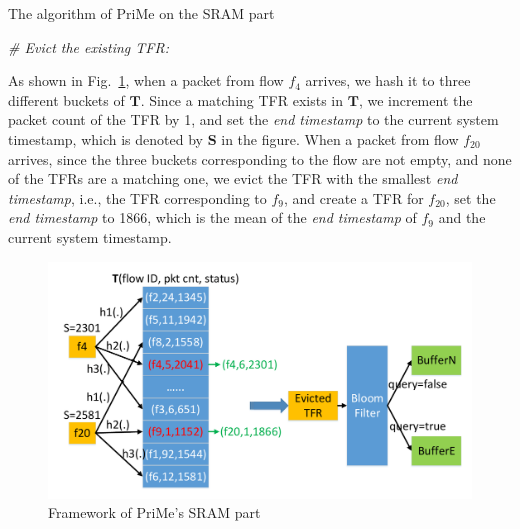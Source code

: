 \documentclass[10pt, conference, letterpaper]{IEEEtran}
\begin{document}
\begin{algorithm}[ht!]
	\caption{The algorithm of PriMe on the SRAM part}
	\label{alg: process_packet}
	\algrenewcommand{}
	\begin{algorithmic}[1]
		\State\Return
		\State\Return
		\EndIf
		\EndFor
		\State \emph{\# Evict the existing TFR:}
		\EndIf
	\end{algorithmic}
\end{algorithm}

As shown in Fig.~\ref{fig:framework}, when a packet from flow $f_4$ arrives, we hash it to three different buckets of $\mathbf{T}$. Since a matching TFR exists in $\mathbf{T}$, we increment the packet count of the TFR by 1, and set the \emph{end timestamp} to the current system timestamp, which is denoted by $\mathbf{S}$ in the figure. When a packet from flow $f_{20}$ arrives, since the three buckets corresponding to the flow are not empty, and none of the TFRs are a matching one, we evict the TFR with the smallest \emph{end timestamp}, i.e., the TFR corresponding to $f_9$, and create a TFR for $f_{20}$, set the \emph{end timestamp} to 1866, which is the mean of the \emph{end timestamp} of $f_9$ and the current system timestamp.
\begin{figure}
	\centering
	\includegraphics[width=\linewidth]{figures/framework/SRAM_part}
	\caption{Framework of PriMe's SRAM part}
	\label{fig:framework}
\end{figure}
\end{document}

